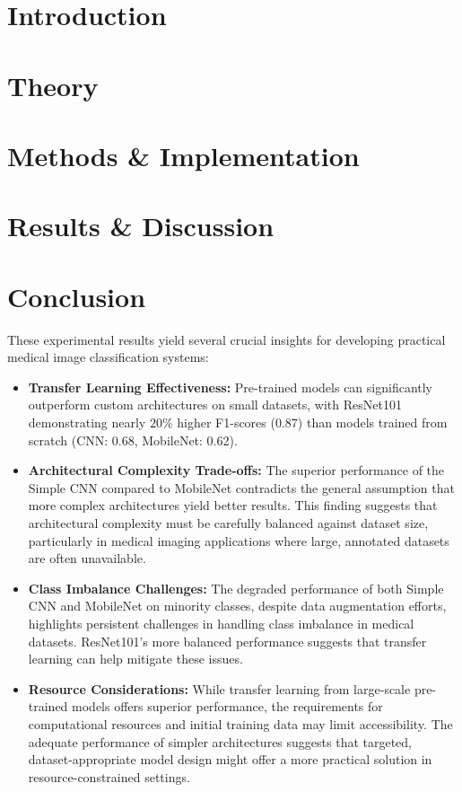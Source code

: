 \documentclass[aps,pra,english,notitlepage,reprint,nofootinbib]{revtex4-1}  %
\begin{document}
\section{Introduction}\label{sec:introduction}



\section{Theory}\label{sec:theory}


\section{Methods \& Implementation}\label{sec:methods}


\section{Results \& Discussion}\label{sec:results discussion}


\section{Conclusion}\label{sec:conclusion}

These experimental results yield several crucial insights for developing practical medical image classification systems:

\begin{itemize}
    \item \textbf{Transfer Learning Effectiveness:} Pre-trained models can significantly outperform custom architectures on small datasets,  with ResNet101 demonstrating nearly $20\%$ higher F1-scores (0.87) than models trained from scratch (CNN: 0.68, MobileNet: 0.62).
    \item \textbf{Architectural Complexity Trade-offs:} The superior performance of the Simple CNN compared to MobileNet contradicts the general assumption that more complex architectures yield better results. This finding suggests that architectural complexity must be carefully balanced against dataset size, particularly in medical imaging applications where large, annotated datasets are often unavailable.
    \item \textbf{Class Imbalance Challenges:} The degraded performance of both Simple CNN and MobileNet on minority classes, despite data augmentation efforts, highlights persistent challenges in handling class imbalance in medical datasets. ResNet101's more balanced performance suggests that transfer learning can help mitigate these issues.
    \item \textbf{Resource Considerations:} While transfer learning from large-scale pre-trained models offers superior performance, the requirements for computational resources and initial training data may limit accessibility. The adequate performance of simpler architectures suggests that targeted, dataset-appropriate model design might offer a more practical solution in resource-constrained settings.
\end{itemize}
\end{document}
